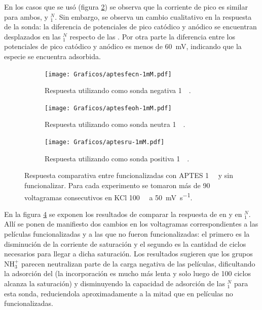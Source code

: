 			En los casos que se usó \fc\space (figura \ref{fig:aptes1mM-vc-fc}) se observa que la corriente de pico es similar para ambos, \pdmZ\space y \pdmZ$^N_1$. Sin embargo, se observa un cambio cualitativo en la respuesta de la sonda: la diferencia de potenciales de pico catódico y anódico se encuentran desplazados en las \pdmZ$^N_1$ respecto de las \pdmZ. Por otra parte la diferencia entre los potenciales de pico catódico y anódico es menos de \SI{60}{\milli\volt}, indicando que la especie se encuentra adsorbida. 

				 \begin{figure}[ht!]	
					\begin{subfigure}[t]{0.495\textwidth}
			 	    \texttt{[image: Graficos/aptesfecn-1mM.pdf]}
			        \caption{Respuesta utilizando como sonda negativa \ferroferri\space \SI{1}{\milli\Molar}.}
			        \label{fig:aptes1mM-vc-fe}
			        \end{subfigure}
			        \begin{subfigure}[t]{0.495\textwidth}
			 	    \texttt{[image: Graficos/aptesfeoh-1mM.pdf]}
			        \caption{Respuesta utilizando como sonda neutra \fc\space \SI{1}{\milli\Molar}.}
			        \label{fig:aptes1mM-vc-fc}
			        \end{subfigure}
			        \begin{center}
			        \begin{subfigure}[t]{0.60\textwidth}
			 	    \texttt{[image: Graficos/aptesru-1mM.pdf]}
			        \caption{Respuesta utilizando como sonda positiva \aminorutenio\space \SI{1}{\milli\Molar}.}
			        \label{fig:aptes1mM-vc-ru}
			        \end{subfigure}
			        \end{center}
			        \caption[Voltagramas de \pdmZ$^P_3$ con \aminorutenio\space y \ferroferri]{Respuesta comparativa entre \pdmZ\space funcionalizadas con APTES \SI{1}{\milli\Molar} y sin funcionalizar. Para cada experimento se tomaron más de 90 voltagramas consecutivos en KCl \SI{100}{\milli\Molar} a \SI{50}{\milli\volt\per\second}.}
			        \label{fig:aptes1mM-vc}
			      	\end{figure}

		  
		  En la figura \ref{fig:aptes1mM-vc} se exponen los resultados de comparar la respuesta de \ru\space en \pdmZ\space y en \pdmZ$^N_1$. Allí se ponen de manifiesto dos cambios en los voltagramas correspondientes a las películas funcionalizadas y a las que no fueron funcionalizadas: el primero es la disminución de la corriente de saturación y el segundo es la cantidad de ciclos necesarios para llegar a dicha saturación. Los resultados sugieren que los grupos NH$_3^+$ parecen neutralizan parte de la carga negativa de las películas, dificultando la adsorción del \ru\space (la incorporación es mucho más lenta y solo luego de 100 ciclos alcanza la saturación) y disminuyendo la capacidad de adsorción de las \pdmZ$^N_{1}$ para esta sonda, reduciendola aproximadamente a la mitad que en películas no funcionalizadas. 

